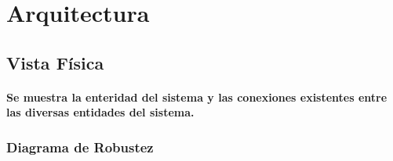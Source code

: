 \documentclass[titlepage,a4paper]{article}
\begin{document}
\section{Arquitectura}\label{sec:arquitectura}

\subsection{Vista Física}
\paragraph{Se muestra la enteridad del sistema y las conexiones existentes entre las diversas entidades del sistema.}

\subsubsection{Diagrama de Robustez}
\end{document}
